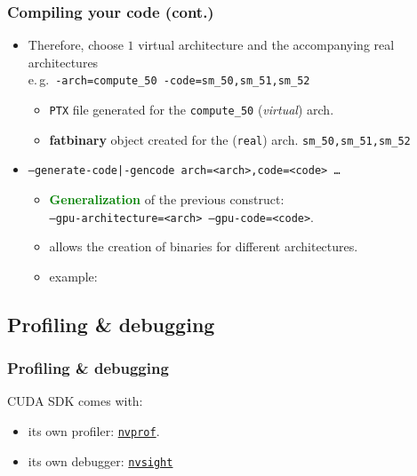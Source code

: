 \begin{frame}
    \frametitle{Compiling your code (cont.)}
      \begin{itemize}

         \item Therefore, choose $1$ virtual architecture and the accompanying real architectures\\
                         e.\,g.\, \texttt{-arch=compute\_50 -code=sm\_50,sm\_51,sm\_52}\\
               \begin{itemize}
   	          \item \texttt{PTX} file generated for the \texttt{compute\_50} (\textit{virtual}) arch.
	          \item \textbf{fatbinary} object created for the (\texttt{real}) arch. \texttt{sm\_50,sm\_51,sm\_52}        
               \end{itemize}

         \item \texttt{--generate-code|-gencode arch=<arch>,code=<code> \ldots} 
             \begin{itemize}		 
		     \item \textbf{\textcolor{green}{Generalization}} of the previous construct:\\
			   \texttt{--gpu-architecture=<arch> --gpu-code=<code>}.
		     \item allows the creation of binaries for different architectures.
	             \item example:
			          
	     \end{itemize}
      \end{itemize}
\end{frame}


\subsection{Profiling \& debugging}
\begin{frame}
   \frametitle{Profiling \& debugging} 
      CUDA SDK comes with:
      \begin{itemize}	
         \item its own profiler: \href{https://docs.nvidia.com/cuda/profiler-users-guide/}{\texttt{nvprof}}.  
	 \item its own debugger: \href{https://docs.nvidia.com/nsight-visual-studio-edition/cuda-debugger/}{\texttt{nvsight}}
      \end{itemize}		 
\end{frame}


